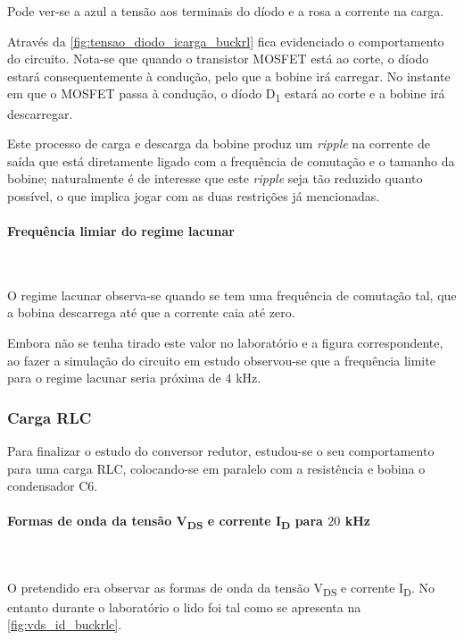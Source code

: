 \documentclass[a4paper,11pt]{article}
\numberwithin{equation}{section}
\begin{document}
Pode ver-se a azul a tensão aos terminais do díodo e a rosa a corrente na carga.

Através da \autoref{fig:tensao_diodo_icarga_buckrl} fica evidenciado o comportamento do circuito. Nota-se que quando o transistor MOSFET está ao corte, o díodo estará consequentemente à condução, pelo que a bobine irá carregar. No instante em que o MOSFET passa à condução, o díodo D\textsubscript{1} estará ao corte e a bobine irá descarregar. 

Este processo de carga e descarga da bobine produz um \textit{ripple} na corrente de saída que está diretamente ligado com a frequência de comutação e o tamanho da bobine; naturalmente é de interesse que este \textit{ripple} seja tão reduzido quanto possível, o que implica jogar com as duas restrições já mencionadas.

\paragraph{Frequência limiar do regime lacunar}\mbox{}\

O regime lacunar observa-se quando se tem uma frequência de comutação tal, que a bobina descarrega até que a corrente caia até zero.

Embora não se tenha tirado este valor no laboratório e a figura correspondente,  ao fazer a simulação do circuito em estudo observou-se que a frequência limite para o regime lacunar seria próxima de $4$ kHz.

\subsubsection{Carga RLC}

Para finalizar o estudo do conversor redutor, estudou-se o seu comportamento para uma carga RLC, colocando-se em paralelo com a resistência e bobina o condensador C6.

\paragraph{Formas de onda da tensão V\textsubscript{DS} e corrente I\textsubscript{D} para $20$ kHz}\mbox{}\

O pretendido era observar as formas de onda da tensão V\textsubscript{DS} e corrente I\textsubscript{D}. No entanto durante o laboratório o lido foi tal como se apresenta na \autoref{fig:vds_id_buckrlc}.
\end{document}
